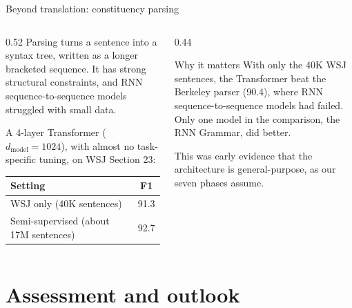\documentclass[aspectratio=169,11pt]{beamer}
\begin{document}
\begin{frame}{Beyond translation: constituency parsing}
  \begin{columns}[T]
    \begin{column}{0.52\textwidth}
      \small
      Parsing turns a sentence into a syntax tree, written as a longer bracketed sequence. It has strong structural constraints, and RNN sequence-to-sequence models struggled with small data.
      \vspace{1mm}

      A 4-layer Transformer ($d_{\text{model}}=1024$), with almost no task-specific tuning, on WSJ Section 23:
      \vspace{1mm}

      \begin{tabular}{@{}lc@{}}
        \toprule
        Setting & F1\\
        \midrule
        WSJ only (40K sentences) & 91.3\\
        Semi-supervised (about 17M sentences) & 92.7\\
        \bottomrule
      \end{tabular}
    \end{column}
    \begin{column}{0.44\textwidth}
      \begin{exampleblock}{Why it matters}
        \small
        With only the 40K WSJ sentences, the Transformer beat the Berkeley parser (90.4), where RNN sequence-to-sequence models had failed.
        Only one model in the comparison, the RNN Grammar, did better.
        \vspace{1mm}

        This was early evidence that the architecture is general-purpose, as our seven phases assume.
      \end{exampleblock}
    \end{column}
  \end{columns}
\end{frame}

\section{Assessment and outlook}
\end{document}
